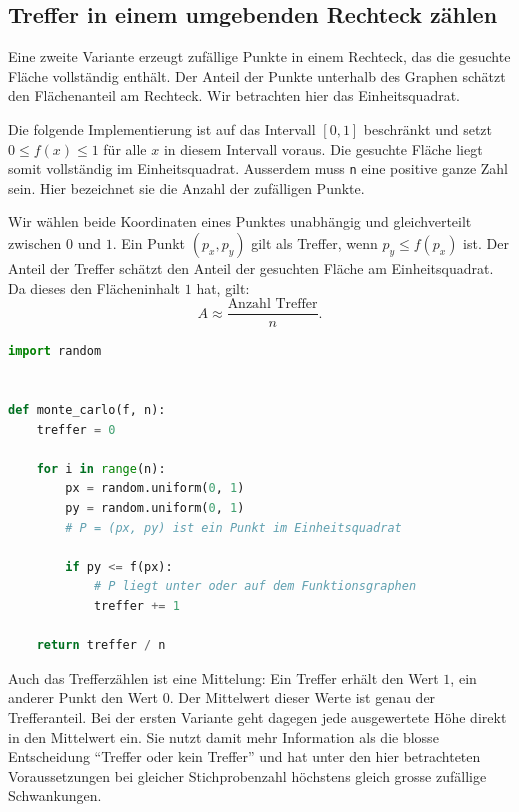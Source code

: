 \subsection{Treffer in einem umgebenden Rechteck zählen}

Eine zweite Variante erzeugt zufällige Punkte in einem Rechteck, das die gesuchte Fläche vollständig enthält. Der Anteil der Punkte unterhalb des Graphen schätzt den Flächenanteil am Rechteck. Wir betrachten hier das Einheitsquadrat.

\begin{myattention}
Die folgende Implementierung ist auf das Intervall $[0,1]$ beschränkt und setzt $0\leq f(x)\leq 1$ für alle $x$ in diesem Intervall voraus. Die gesuchte Fläche liegt somit vollständig im Einheitsquadrat. Ausserdem muss \lstinline|n| eine positive ganze Zahl sein. Hier bezeichnet sie die Anzahl der zufälligen Punkte.
\end{myattention}

Wir wählen beide Koordinaten eines Punktes unabhängig und gleichverteilt zwischen $0$ und $1$. Ein Punkt $(p_x,p_y)$ gilt als Treffer, wenn $p_y\leq f(p_x)$ ist. Der Anteil der Treffer schätzt den Anteil der gesuchten Fläche am Einheitsquadrat. Da dieses den Flächeninhalt $1$ hat, gilt:
\[
    A \approx \frac{\text{Anzahl Treffer}}{n}.
\]

\begin{lstlisting}[language=Python, caption={Monte-Carlo-Methode im Einheitsquadrat}, label={lst:quadratur-monte-carlo}]
import random


def monte_carlo(f, n):
    treffer = 0

    for i in range(n):
        px = random.uniform(0, 1)
        py = random.uniform(0, 1)
        # P = (px, py) ist ein Punkt im Einheitsquadrat

        if py <= f(px):
            # P liegt unter oder auf dem Funktionsgraphen
            treffer += 1

    return treffer / n
\end{lstlisting}

Auch das Trefferzählen ist eine Mittelung: Ein Treffer erhält den Wert $1$, ein anderer Punkt den Wert $0$. Der Mittelwert dieser Werte ist genau der Trefferanteil. Bei der ersten Variante geht dagegen jede ausgewertete Höhe direkt in den Mittelwert ein. Sie nutzt damit mehr Information als die blosse Entscheidung \enquote{Treffer oder kein Treffer} und hat unter den hier betrachteten Voraussetzungen bei gleicher Stichprobenzahl höchstens gleich grosse zufällige Schwankungen.

